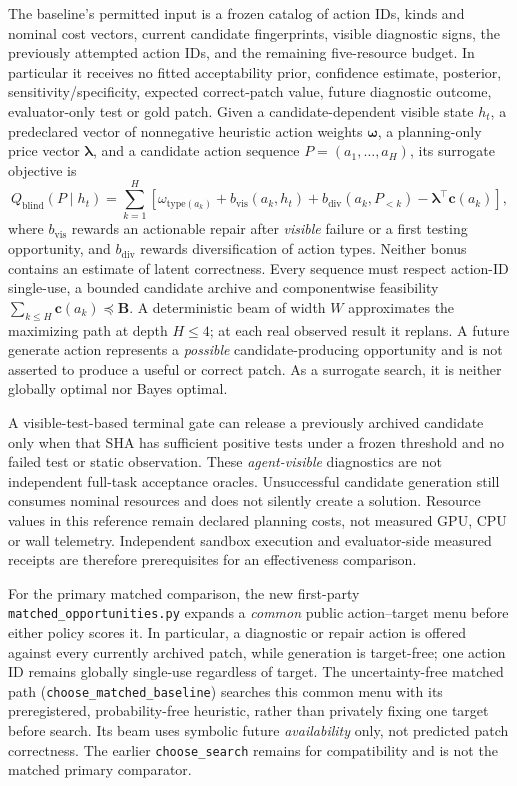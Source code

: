 \documentclass[pdflatex,sn-basic]{sn-jnl}
\begin{document}
The baseline's permitted input is a frozen catalog of action IDs,
kinds and nominal cost vectors, current candidate fingerprints,
visible diagnostic signs, the previously attempted action IDs,
and the remaining five-resource budget. In particular it receives
no fitted acceptability prior, confidence estimate, posterior,
sensitivity/specificity, expected correct-patch value, future
diagnostic outcome, evaluator-only test or gold patch. Given
a candidate-dependent visible state $h_t$, a predeclared vector
of nonnegative heuristic action weights $\boldsymbol\omega$, a
planning-only price vector $\boldsymbol\lambda$, and a candidate
action sequence $P=(a_1,\ldots,a_H)$, its surrogate objective is
\begin{equation}
 Q_{\mathrm{blind}}(P\mid h_t)
 =\sum_{k=1}^{H}\left[
 \omega_{\mathrm{type}(a_k)}
 +b_{\mathrm{vis}}(a_k,h_t)
 +b_{\mathrm{div}}(a_k,P_{<k})
 -\boldsymbol\lambda^\top\mathbf c(a_k)\right],
 \label{eq:blind-heuristic-beam}
\end{equation}
where $b_{\mathrm{vis}}$ rewards an actionable repair after
\emph{visible} failure or a first testing opportunity, and
$b_{\mathrm{div}}$ rewards diversification of action types.
Neither bonus contains an estimate of latent correctness.
Every sequence must respect action-ID single-use, a bounded
candidate archive and componentwise feasibility
$\sum_{k\le H}\mathbf c(a_k)\preceq\mathbf B$.
A deterministic beam of width $W$ approximates the maximizing
path at depth $H\le4$; at each real observed result it replans.
A future generate action represents a \emph{possible}
candidate-producing opportunity and is not asserted to produce
a useful or correct patch. As a surrogate search, it is neither
globally optimal nor Bayes optimal.

A visible-test-based terminal gate can release a previously
archived candidate only when that SHA has sufficient positive
tests under a frozen threshold and no failed test or static
observation. These \emph{agent-visible} diagnostics are not
independent full-task acceptance oracles. Unsuccessful candidate
generation still consumes nominal resources and does not
silently create a solution. Resource values in this reference
remain declared planning costs, not measured GPU, CPU or wall
telemetry. Independent sandbox execution and evaluator-side
measured receipts are therefore prerequisites for an
effectiveness comparison.

For the primary matched comparison, the new first-party
\texttt{matched\_opportunities.py} expands a \emph{common}
public action--target menu before either policy scores it.
In particular, a diagnostic or repair action is offered against
every currently archived patch, while generation is target-free;
one action ID remains globally single-use regardless of target.
The uncertainty-free matched path
(\texttt{choose\_matched\_baseline}) searches this common menu
with its preregistered, probability-free heuristic, rather than
privately fixing one target before search. Its beam uses symbolic
future \emph{availability} only, not predicted patch correctness.
The earlier \texttt{choose\_search} remains for compatibility
and is not the matched primary comparator.
\end{document}

